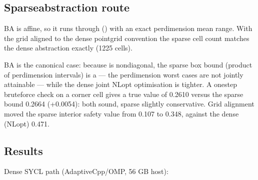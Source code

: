 \documentclass[a4paper,10pt,english]{sphinxmanual}
\begin{document}
\subsection{Sparse\sphinxhyphen{}abstraction route}
\label{\detokenize{benchmarks/BA:sparse-abstraction-route}}
\sphinxAtStartPar
BA is affine, so it runs through  () with an
exact per\sphinxhyphen{}dimension mean range. With the grid aligned to the dense point\sphinxhyphen{}grid
convention the sparse cell count matches the dense abstraction exactly (1225 cells).

\sphinxAtStartPar
BA is the canonical  case: because  is non\sphinxhyphen{}diagonal, the sparse
box bound (product of per\sphinxhyphen{}dimension intervals) is a  —
the per\sphinxhyphen{}dimension worst cases are not jointly attainable — while the dense joint
NLopt optimisation is tighter. A one\sphinxhyphen{}step brute\sphinxhyphen{}force check on a corner cell gives a
true value of 0.2610 versus the sparse bound 0.2664 (+0.0054): both sound, sparse
slightly conservative. Grid alignment moved the sparse interior safety value from
0.107 to 0.348, against the dense (NLopt) 0.471.


\subsection{Results}
\label{\detokenize{benchmarks/BA:results}}
\sphinxAtStartPar
Dense SYCL path (AdaptiveCpp/OMP, 56 GB host):
\end{document}
